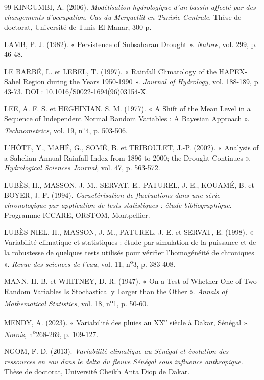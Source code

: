 \documentclass[12pt,a4paper]{report}
\begin{document}
\begin{thebibliography}{99}
KINGUMBI, A. (2006). \textit{Modélisation hydrologique d'un bassin affecté par des changements d'occupation. Cas du Merguellil en Tunisie Centrale}. Thèse de doctorat, Université de Tunis El Manar, 300 p.

LAMB, P. J. (1982). « Persistence of Subsaharan Drought ». \textit{Nature}, vol. 299, p. 46-48.

LE BARBÉ, L. et LEBEL, T. (1997). « Rainfall Climatology of the HAPEX-Sahel Region during the Years 1950-1990 ». \textit{Journal of Hydrology}, vol. 188-189, p. 43-73. DOI : 10.1016/S0022-1694(96)03154-X.

LEE, A. F. S. et HEGHINIAN, S. M. (1977). « A Shift of the Mean Level in a Sequence of Independent Normal Random Variables : A Bayesian Approach ». \textit{Technometrics}, vol. 19, n\textsuperscript{o}4, p. 503-506.

L'HÔTE, Y., MAHÉ, G., SOMÉ, B. et TRIBOULET, J.-P. (2002). « Analysis of a Sahelian Annual Rainfall Index from 1896 to 2000; the Drought Continues ». \textit{Hydrological Sciences Journal}, vol. 47, p. 563-572.

LUBÈS, H., MASSON, J.-M., SERVAT, E., PATUREL, J.-E., KOUAMÉ, B. et BOYER, J.-F. (1994). \textit{Caractérisation de fluctuations dans une série chronologique par application de tests statistiques : étude bibliographique}. Programme ICCARE, ORSTOM, Montpellier.

LUBÈS-NIEL, H., MASSON, J.-M., PATUREL, J.-E. et SERVAT, E. (1998). « Variabilité climatique et statistiques : étude par simulation de la puissance et de la robustesse de quelques tests utilisés pour vérifier l'homogénéité de chroniques ». \textit{Revue des sciences de l'eau}, vol. 11, n\textsuperscript{o}3, p. 383-408.

MANN, H. B. et WHITNEY, D. R. (1947). « On a Test of Whether One of Two Random Variables Is Stochastically Larger than the Other ». \textit{Annals of Mathematical Statistics}, vol. 18, n\textsuperscript{o}1, p. 50-60.

MENDY, A. (2023). « Variabilité des pluies au XX\textsuperscript{e} siècle à Dakar, Sénégal ». \textit{Norois}, n\textsuperscript{o}268-269, p. 109-127.

NGOM, F. D. (2013). \textit{Variabilité climatique au Sénégal et évolution des ressources en eau dans le delta du fleuve Sénégal sous influence anthropique}. Thèse de doctorat, Université Cheikh Anta Diop de Dakar.


\end{thebibliography}
\end{document}
